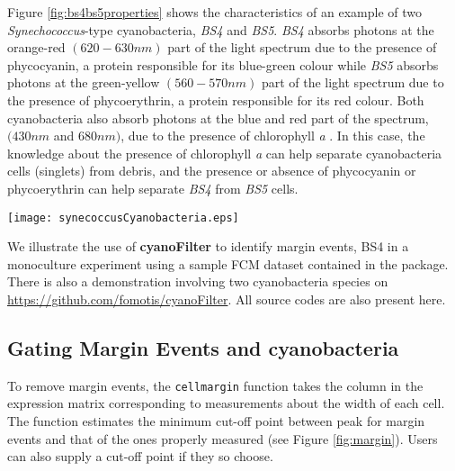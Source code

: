 \documentclass[9pt]{extarticle}
\begin{document}
Figure \ref{fig:bs4bs5properties} shows the characteristics of an example of two \emph{Synechococcus}-type cyanobacteria, \emph{BS4} and \emph{BS5}. \emph{BS4} absorbs photons at the orange-red $(620-630nm)$ part of the light spectrum due to the presence of phycocyanin, a protein responsible for its blue-green colour while \emph{BS5} absorbs photons at the green-yellow $(560-570nm)$ part of the light spectrum due to the presence of phycoerythrin, a protein responsible for its red colour. Both cyanobacteria also absorb photons at the blue and red part of the spectrum, $(430nm$ and $680nm)$, due to the presence of chlorophyll \emph{a} \citep{Stomp:2004}. In this case, the knowledge about the presence of chlorophyll \emph{a} can help separate cyanobacteria cells (singlets) from debris, and the presence or absence of phycocyanin or phycoerythrin can help separate \emph{BS4} from \emph{BS5} cells.

\begin{figure*}[h]
	\centering
	\texttt{[image: synecoccusCyanobacteria.eps]}
	\caption{\label{fig:bs4bs5properties}Two \emph{Synechococcus}-type cyanobacteria named BS4 and BS5.}
\end{figure*}

We illustrate the use of \textbf{cyanoFilter} to identify margin events, BS4 in a monoculture experiment using a sample FCM dataset contained in the package. There is also a demonstration involving two cyanobacteria species on \href{https://github.com/fomotis/cyanoFilter}{https://github.com/fomotis/cyanoFilter}. All source codes are also present here.

\subsection*{Gating Margin Events and cyanobacteria}

To remove margin events, the \texttt{cellmargin} function takes the column in the expression matrix corresponding to measurements about the width of each cell. The function estimates the minimum cut-off point between peak for margin events and that of the ones properly measured (see Figure \ref{fig:margin}). Users can also supply a cut-off point if they so choose.
\end{document}
